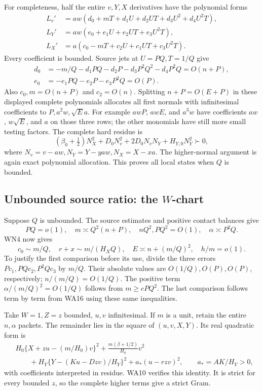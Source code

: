 For completeness, half the entire \(v,Y,X\) derivatives have
the polynomial forms
\[
\begin{aligned}
 L_v'&=aw(d_0+mT+d_1U+d_2UT+d_3U^2+d_4U^2T),\\
 L_Y'&=aw(e_0+e_1U+e_2UT+e_3U^2T),\\
 L_X'&=a(c_0-mT+c_2U+c_1UT+c_3U^2T).
\end{aligned}\tag{WN15}
\]
Every coefficient is bounded. Source jets at
\(U=PQ,T=1/Q\) give
\[
\begin{split}
d_0&=-m/Q-d_1PQ-d_2P-d_3P^2Q^2-d_4P^2Q=O(n+P),\\
e_0&=-e_1PQ-e_2P-e_3P^2Q=O(P).
\end{split}
\]
Also \(c_0,m=O(n+P)\) and \(c_2=O(n)\).
Splitting \(n+P=O(E+P)\) in these displayed complete polynomials
allocates all first normals with infinitesimal coefficients to
\(P,a^2w,\sqrt E a\). For example \(awP\), \(awE\), and
\(a^3w\) have coefficients \(aw\), \(w\sqrt E\), and \(a\)
on those three rows; the other monomials have still more small
testing factors. The complete hard residue is
\[
 (\beta_0+\tfrac12)N_X^2+
 D_0N_v^2+2D_0N_vN_Y+H_{Y,0}N_Y^2\succ0,
 \tag{WN16}
\]
where \(N_v=v-aw,N_Y=Y-yaw,N_X=X-xa\).
The higher-normal argument is again exact polynomial allocation.
This proves all local states when \(Q\) is bounded.

\subsection{Unbounded source ratio: the \(W\)-chart}

Suppose \(Q\) is unbounded. The source estimates and positive
contact balances give
\[
 PQ=o(1),\quad m\asymp Q^2(n+P),\quad nQ^2,PQ^2=O(1),
 \quad \alpha\asymp P^2Q .
 \tag{WN17}
\]
WN4 now gives
\[
 c_0\sim m/Q,\quad r+x\sim m/(H_XQ),\quad
 E\asymp n+(m/Q)^2,\quad h/m=o(1).
 \tag{WN18}
\]
To justify the first comparison before its use, divide the three
errors \(Pc_1,PQc_2,P^2Qc_3\) by \(m/Q\).
Their absolute values are \(O(1/Q),O(P),O(P)\), respectively;
\(n/(m/Q)=O(1/Q)\). The positive term
\(\alpha/(m/Q)^2=O(1/Q)\) follows from
\(m\geq cPQ^2\). The last comparison follows term by term from
WA16 using these same inequalities.

Take \(W=1,Z=z\) bounded, \(u,v\) infinitesimal. If \(m\) is a
unit, retain the entire \(n,\alpha\) packets. The remainder lies
in the square of \((u,v,X,Y)\). Its real quadratic form is
\[
\begin{split}
 &H_0\{X+zu-(m/H_0)v\}^2+
       \frac{m(\beta+1/2)}{H_0}v^2\\
 &\qquad+H_Y\{Y-(Ku-Dzv)/H_Y\}^2
       +a_*(u-rzv)^2,\qquad a_*=AK/H_Y>0,
\end{split}\tag{WN19}
\]
with coefficients interpreted in residue. WA10 verifies this
identity. It is strict for every bounded \(z\), so the complete
higher terms give a strict Gram.

